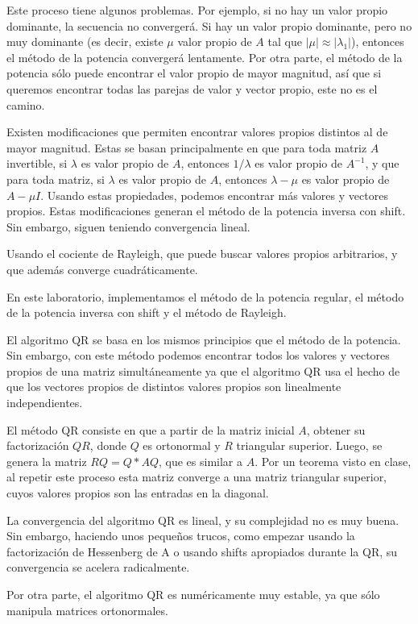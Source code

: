 \documentclass[11pt]{article}
\begin{document}
Este proceso tiene algunos problemas. Por ejemplo, si no hay un valor propio dominante, la secuencia no convergerá. Si hay un valor propio dominante, pero no muy dominante (es decir, existe $\mu$ valor propio de $A$ tal que $|\mu|\approx |\lambda_1|$), entonces el método de la potencia convergerá lentamente. Por otra parte, el método de la potencia sólo puede encontrar el valor propio de mayor magnitud, así que si queremos encontrar todas las parejas de valor y vector propio, este no es el camino.

Existen modificaciones que permiten encontrar valores propios distintos al de mayor magnitud. Estas se basan principalmente en que para toda matriz $A$ invertible, si $\lambda$ es valor propio de $A$, entonces $1/\lambda$ es valor propio de $A^{-1}$, y que para toda matriz, si $\lambda$ es valor propio de $A$, entonces $\lambda-\mu$ es valor propio de $A-\mu I$. Usando estas propiedades, podemos encontrar más valores y vectores propios. Estas modificaciones generan el método de la potencia inversa con shift. Sin embargo, siguen teniendo convergencia lineal.

Usando el cociente de Rayleigh, que puede buscar valores propios arbitrarios, y que además converge cuadráticamente.

En este laboratorio, implementamos el método de la potencia regular, el método de la potencia inversa con shift y el método de Rayleigh.

El algoritmo QR se basa en los mismos principios que el método de la potencia. Sin embargo, con este método podemos encontrar todos los valores y vectores propios de una matriz simultáneamente ya que el algoritmo QR usa el hecho de que los vectores propios de distintos valores propios son linealmente independientes.

El método QR consiste en que a partir de la matriz inicial $A$, obtener su factorización $QR$, donde $Q$ es ortonormal y $R$ triangular superior. Luego, se genera la matriz $RQ=Q*AQ$, que es similar a $A$. Por un teorema visto en clase, al repetir este proceso esta matriz converge a una matriz triangular superior, cuyos valores propios son las entradas en la diagonal.

La convergencia del algoritmo QR es lineal, y su complejidad no es muy buena. Sin embargo, haciendo unos pequeños trucos, como empezar usando la factorización de Hessenberg de A o usando shifts apropiados durante la QR, su convergencia se acelera radicalmente.

Por otra parte, el algoritmo QR es numéricamente muy estable, ya que sólo manipula matrices ortonormales.
\end{document}
